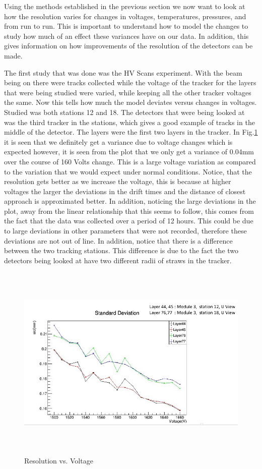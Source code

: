 \documentclass[./Thesis]{subfiles}
\begin{document}
	Using the methods established in the previous section we now want to look at how the resolution varies for changes in voltages, temperatures, pressures, and from run to run. This is important to understand how to model the changes to study how much of an effect these variances have on our data.  In addition, this gives information on how improvements of the resolution of the detectors can be made.
	
	The first study that was done was the HV Scans experiment.  With the beam being on there were tracks collected while the voltage of the tracker for the layers that were being studied were varied, while keeping all the other tracker voltages the same.  Now this tells how much the model deviates versus changes in voltages.  Studied was both stations 12 and 18.  The detectors that were being looked at was the third tracker in the stations, which gives a good example of tracks in the middle of the detector.  The layers were the first two layers in the tracker.  In Fig.\ref{fig:ResVolt} it is seen that we definitely get a variance due to voltage changes which is expected however, it is seen from the plot that we only get a variance of 0.04mm over the course of 160 Volts change. This is a large voltage variation as compared to the variation that we would expect under normal conditions.  Notice, that the resolution gets better as we increase the voltage, this is because at higher voltages the larger the deviations in the drift times and the distance of closest approach is approximated better.  In addition, noticing the large deviations in the plot, away from the linear relationship that this seems to follow, this comes from the fact that the data was collected over a period of 12 hours.  This could be due to large deviations in other parameters that were not recorded, therefore these deviations are not out of line.  In addition, notice that there is a difference between the two tracking stations.  This difference is due to the fact the two detectors being looked at have two different radii of straws in the tracker.

\begin{figure}
	\centerline{\includegraphics[height=95mm]{ResolutionVsVoltage.jpeg}}
	\caption[Resolution Vs Voltage]{ Resolution vs. Voltage}
	\label{fig:ResVolt}
\end{figure} 	
\end{document}
